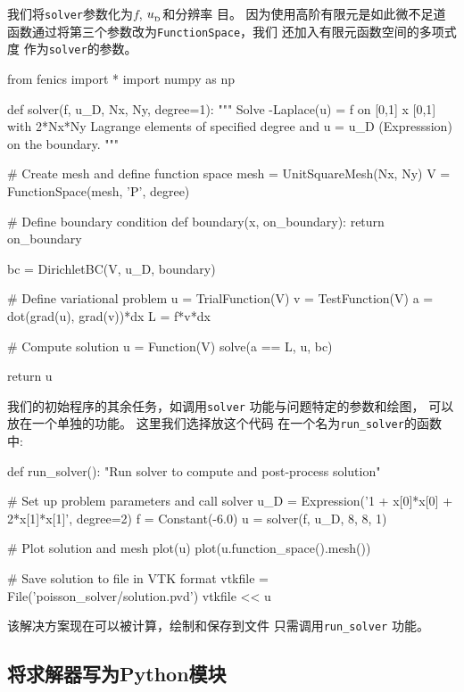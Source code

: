 我们将\texttt{solver}参数化为$f$, $\ub$和分辨率
目。 因为使用高阶有限元是如此微不足道
函数通过将第三个参数改为\texttt{FunctionSpace}，我们
还加入有限元函数空间的多项式度
作为\texttt{solver}的参数。

\begin{python}
from fenics import *
import numpy as np

def solver(f, u_D, Nx, Ny, degree=1):
    """
    Solve -Laplace(u) = f on [0,1] x [0,1] with 2*Nx*Ny Lagrange
    elements of specified degree and u = u_D (Expresssion) on
    the boundary.
    """

    # Create mesh and define function space
    mesh = UnitSquareMesh(Nx, Ny)
    V = FunctionSpace(mesh, 'P', degree)

    # Define boundary condition
    def boundary(x, on_boundary):
        return on_boundary

    bc = DirichletBC(V, u_D, boundary)

    # Define variational problem
    u = TrialFunction(V)
    v = TestFunction(V)
    a = dot(grad(u), grad(v))*dx
    L = f*v*dx

    # Compute solution
    u = Function(V)
    solve(a == L, u, bc)

    return u
\end{python}

我们的初始程序的其余任务，如调用\texttt{solver}
功能与问题特定的参数和绘图，
可以放在一个单独的功能。 这里我们选择放这个代码
在一个名为\verb!run_solver!的函数中:

\begin{python}
def run_solver():
    "Run solver to compute and post-process solution"

    # Set up problem parameters and call solver
    u_D = Expression('1 + x[0]*x[0] + 2*x[1]*x[1]', degree=2)
    f = Constant(-6.0)
    u = solver(f, u_D, 8, 8, 1)

    # Plot solution and mesh
    plot(u)
    plot(u.function_space().mesh())

    # Save solution to file in VTK format
    vtkfile = File('poisson_solver/solution.pvd')
    vtkfile << u
\end{python}

该解决方案现在可以被计算，绘制和保存到文件
只需调用\verb!run_solver! 功能。

\subsection{将求解器写为Python模块}


